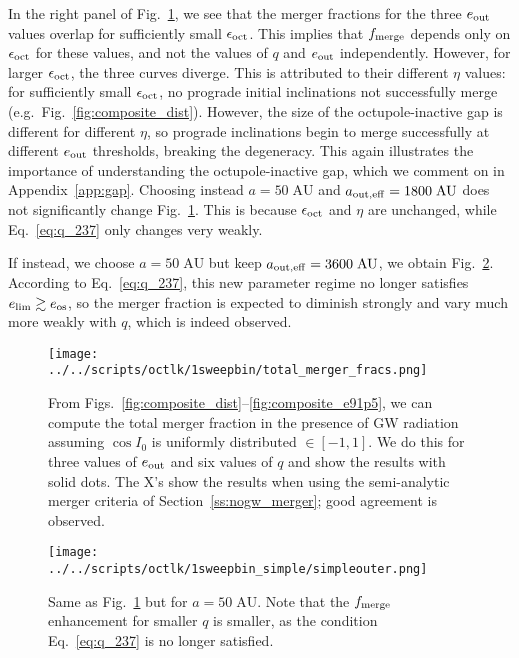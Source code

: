 \documentclass[
        fleqn,
        usenatbib,
    ]{mnras}
\begin{document}
In the right panel of Fig.~\ref{fig:total_merger_fracs}, we see that the merger
fractions for the three $e_{\rm out}$ values overlap for sufficiently small
$\epsilon_{\rm oct}$. This implies that $f_{\rm merge}$ depends only on
$\epsilon_{\rm oct}$ for these values, and not the values of $q$ and $e_{\rm
out}$ independently. However, for larger $\epsilon_{\rm oct}$, the three curves
diverge. This is attributed to their different $\eta$ values: for sufficiently
small $\epsilon_{\rm oct}$, no prograde initial inclinations not successfully
merge (e.g.\ Fig.~\ref{fig:composite_dist}). However, the size of the
octupole-inactive gap is different for different $\eta$, so prograde
inclinations begin to merge successfully at different $e_{\rm out}$ thresholds,
breaking the degeneracy. This again illustrates the importance of understanding
the octupole-inactive gap, which we comment on in Appendix~\ref{app:gap}.
Choosing instead $a = 50\;\mathrm{AU}$ and $a_{\rm out, eff} =
1800\;\mathrm{AU}$ does not significantly change
Fig.~\ref{fig:total_merger_fracs}. This is because $\epsilon_{\rm oct}$ and
$\eta$ are unchanged, while Eq.~\eqref{eq:q_237} only changes very weakly.

If instead, we choose $a = 50\;\mathrm{AU}$ but keep $a_{\rm out, eff} =
3600\;\mathrm{AU}$, we obtain Fig.~\ref{fig:sweepbin_simpleouter}. According to
Eq.~\eqref{eq:q_237}, this new parameter regime no longer satisfies $e_{\lim}
\gtrsim e_{\rm os}$, so the merger fraction is expected to diminish strongly and
vary much more weakly with $q$, which is indeed observed.
\begin{figure*}
    \centering
    \texttt{[image: ../../scripts/octlk/1sweepbin/total\_merger\_fracs.png]}
    \caption{From Figs.~\ref{fig:composite_dist}--\ref{fig:composite_e91p5},
    we can compute the total merger fraction in the presence of GW radiation
    assuming $\cos I_0$ is uniformly distributed $\in [-1, 1]$. We do this for
    three values of $e_{\rm out}$ and six values of $q$ and show the results
    with solid dots. The X's show the results when using the semi-analytic
    merger criteria of Section~\ref{ss:nogw_merger}; good agreement
    is observed. }\label{fig:total_merger_fracs}
\end{figure*}
\begin{figure*}
    \centering
    \texttt{[image: ../../scripts/octlk/1sweepbin\_simple/simpleouter.png]}
    \caption{Same as Fig.~\ref{fig:total_merger_fracs} but for $a =
    50\;\mathrm{AU}$. Note that the $f_{\rm merge}$ enhancement for smaller $q$
    is smaller, as the condition Eq.~\eqref{eq:q_237} is no longer satisfied.
    }\label{fig:sweepbin_simpleouter}
\end{figure*}
\end{document}
